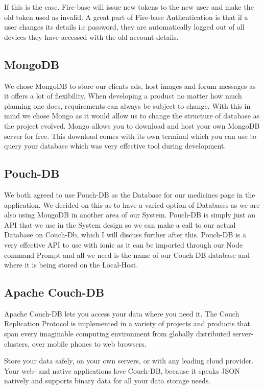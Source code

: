 \documentclass[12pt,a4paper,oneside,openany]{book}
\begin{document}
If this is the case. Fire-base will issue new tokens to the new user and make the old token used as invalid. A great part of Fire-base Authentication is that if a user changes its details i.e password, they are automatically logged out of all devices they have accessed with the old account details.

\subsection{MongoDB}
We chose MongoDB to store our clients ads, host images and forum messages as it offers a lot of flexibility. When developing a product no matter how much planning one does, requirements can always be subject to change. With this in mind we chose Mongo as it would allow us to change the structure of database as the project evolved. Mongo allows you to download and host your own MongoDB server for free. This download comes with its own terminal which you can use to query your database which was very effective tool during development.

\subsection{Pouch-DB}
We both agreed to use Pouch-DB as the Database for our medicines page in the application. We decided on this as to have a varied option of Databases as we are also using MongoDB in another area of our System. Pouch-DB is simply just an API that we use in the System design so we can make a call to our actual Database on Couch-Db, which I will discuss further after this. Pouch-DB is a very effective API to use with ionic as it can be imported through our Node command Prompt and all we need is the name of our Couch-DB database and where it is being stored on the Local-Host.

\subsection{Apache Couch-DB}
Apache Couch-DB lets you access your data where you need it. The Couch Replication Protocol is implemented in a variety of projects and products that span every imaginable computing environment from globally distributed server-clusters, over mobile phones to web browsers.

Store your data safely, on your own servers, or with any leading cloud provider. Your web- and native applications love Couch-DB, because it speaks JSON natively and supports binary data for all your data storage needs.
\end{document}
